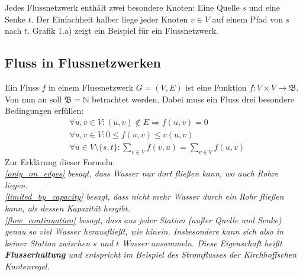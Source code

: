 \documentclass[12pt,a4paper,titlepage,onecolumn,ngerman,draft]{scrartcl}
\begin{document}
Jedes Flussnetzwerk enthält zwei besondere Knoten: Eine Quelle $s$ und eine Senke $t$.
Der Einfachheit halber liege jeder Knoten $v \in V$ auf einem Pfad von $s$ nach $t$.
Grafik 1.a) zeigt ein Beispiel für ein Flussnetzwerk.

\subsection{Fluss in Flussnetzwerken}
Ein Fluss $f$ in einem Flussnetzwerk $G=(V,E)$ ist eine Funktion $f: V \times V \to \mathfrak{B}$. Von nun an soll $\mathfrak{B} = \mathbb{N}$ betrachtet werden.
Dabei muss ein Fluss drei besondere Bedingungen erfüllen:
\begin{align}
&\forall u,v\in V\colon (u,v)\notin E\Rightarrow f(u,v) = 0 \label{only_on_edges} \\
&\forall u,v\in V\colon 0\leq f(u,v)\leq c(u,v) \label{limited_by_capacity} \\
&\forall u\in V\setminus\{s,t\}\colon\sum_{v\in V} f(v,u) = \sum_{v\in V} f(u,v) \label{flow_continuation}
\end{align}
Zur Erklärung dieser Formeln: \\
\textit{
\eqref{only_on_edges} besagt, dass Wasser nur dort fließen kann, wo auch Rohre liegen. \\
\eqref{limited_by_capacity} besagt, dass nicht mehr Wasser durch ein Rohr fließen kann, als dessen Kapazität hergibt. \\
\eqref{flow_continuation} besagt, dass aus jeder Station (außer Quelle und Senke) genau so viel Wasser herausfließt, wie hinein. Insbesondere kann sich also in keiner Station zwischen $s$ und $t$ Wasser ansammeln. Diese Eigenschaft heißt \textbf{Flusserhaltung} und entspricht im Beispiel des Stromflusses der Kirchhoffschen Knotenregel.}
\end{document}
